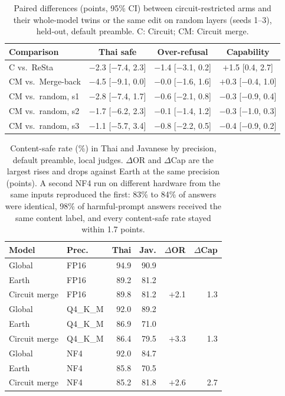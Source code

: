 \documentclass[11pt]{article}
\begin{document}
\begin{table}[t]
\centering\small
\begin{tabular}{lccc}
\toprule
Comparison & Thai safe & Over-refusal & Capability \\
\midrule
C vs.\ ReSta & $-$2.3 [$-$7.4, 2.3] & $-$1.4 [$-$3.1, 0.2] & $+$1.5 [0.4, 2.7] \\
CM vs.\ Merge-back & $-$4.5 [$-$9.1, 0.0] & $-$0.0 [$-$1.6, 1.6] & $+$0.3 [$-$0.4, 1.0] \\
CM vs.\ random, s1 & $-$2.8 [$-$7.4, 1.7] & $-$0.6 [$-$2.1, 0.8] & $-$0.3 [$-$0.9, 0.4] \\
CM vs.\ random, s2 & $-$1.7 [$-$6.2, 2.3] & $-$0.1 [$-$1.4, 1.2] & $-$0.3 [$-$1.0, 0.3] \\
CM vs.\ random, s3 & $-$1.1 [$-$5.7, 3.4] & $-$0.8 [$-$2.2, 0.5] & $-$0.4 [$-$0.9, 0.2] \\
\bottomrule
\end{tabular}
\caption{Paired differences (points, 95\% CI) between circuit-restricted arms and their whole-model twins or the
same edit on random layers (seeds 1--3), held-out, default preamble. C: Circuit; CM: Circuit merge.}
\label{tab:circuit}
\end{table}

\begin{table}[ht]
\centering\small
\setlength{\tabcolsep}{3.5pt}
\begin{tabular}{llrrrr}
\toprule
Model & Prec. & Thai & Jav. & $\Delta$OR & $\Delta$Cap \\
\midrule
Global & FP16 & 94.9 & 90.9 & & \\
Earth & FP16 & 89.2 & 81.2 & & \\
Circuit merge & FP16 & 89.8 & 81.2 & $+$2.1 & 1.3 \\
\midrule
Global & Q4\_K\_M & 92.0 & 89.2 & & \\
Earth & Q4\_K\_M & 86.9 & 71.0 & & \\
Circuit merge & Q4\_K\_M & 86.4 & 79.5 & $+$3.3 & 1.3 \\
\midrule
Global & NF4 & 92.0 & 84.7 & & \\
Earth & NF4 & 85.8 & 70.5 & & \\
Circuit merge & NF4 & 85.2 & 81.8 & $+$2.6 & 2.7 \\
\bottomrule
\end{tabular}
\caption{Content-safe rate (\%) in Thai and Javanese by precision, default preamble, local judges. $\Delta$OR
and $\Delta$Cap are the largest rises and drops against Earth at the same precision (points). A second NF4 run on
different hardware from the same inputs reproduced the first: 83\% to 84\% of answers were identical, 98\% of
harmful-prompt answers received the same content label, and every content-safe rate stayed within 1.7 points.}
\label{tab:quant}
\end{table}
\end{document}
